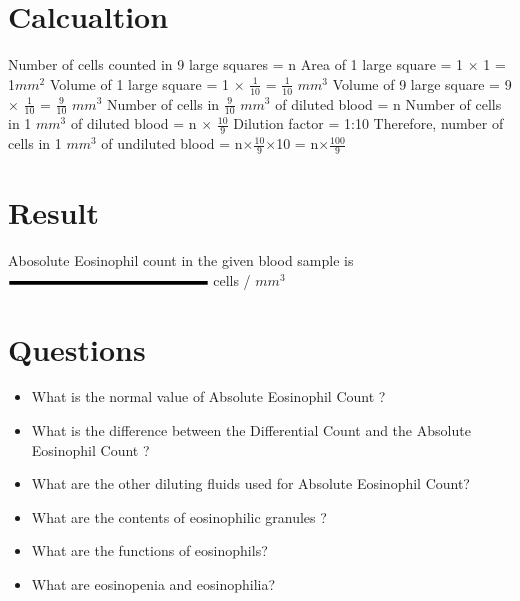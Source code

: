 \documentclass[a4paper,12pt]{book}
\begin{document}
	\section*{Calcualtion}
	Number of cells counted in 9 large squares				=	n\newline\vspace{.2cm}
	Area of 1 large square				=	1 $\times$ 1		=	1$mm^2$	\newline\vspace{.2cm}
	Volume of 1 large square				=	1 $\times$ $\frac{1}{10}$	=	$\frac{1}{10}$ $mm^3$\newline\vspace{.2cm}
	Volume of 9 large square				=	9 $\times$ $\frac{1}{10}$	=	$\frac{9}{10}$ $mm^3$\newline\vspace{.2cm}
	Number of cells in $\frac{9}{10}$ $mm^3$ of diluted blood				=	n\newline\vspace{.2cm}
	Number of cells in 1 $mm^3$ of diluted blood				=	n $\times$ $\frac{10}{9}$\newline\vspace{.2cm}
	Dilution factor								=	1:10\newline\vspace{.2cm}
Therefore, number of cells in 1 $mm^3$ of undiluted blood		=	n$\times$$\frac{10}{9}$$\times$10
										=	n$\times$$\frac{100}{9}$
	\section*{Result}

Abosolute Eosinophil count in the given  blood sample is $\rule{5cm}{0.1cm}$ cells / $mm^3$

	\section*{Questions}
	\begin{itemize}

\item{What is the normal value of Absolute Eosinophil Count ?}
\item{What is the difference between the Differential Count and the Absolute Eosinophil Count ?}
\item{What are the other diluting fluids used for Absolute Eosinophil Count?}
\item{What are the contents of eosinophilic granules ?}
\item{What are the functions of eosinophils?}
\item{What are eosinopenia and eosinophilia?}
	\end{itemize}
\end{document}
